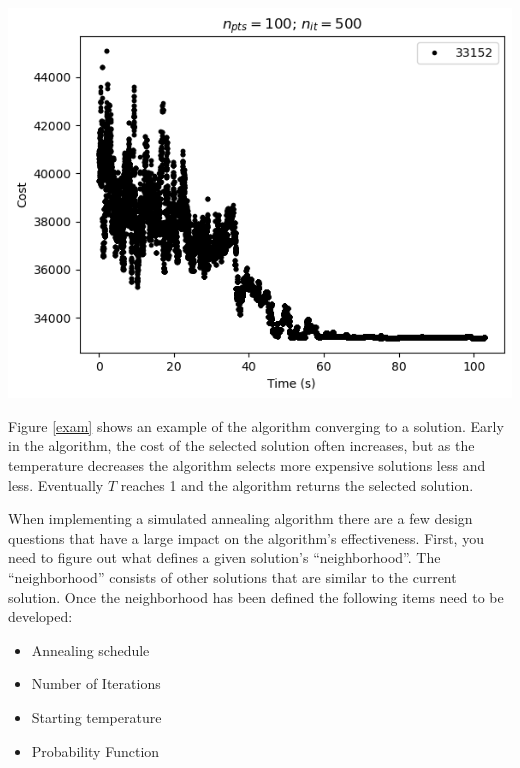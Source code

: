 \documentclass{article}
\begin{document}
\begin{multicols}{2}
        \begin{center}
            \begin{minipage}{0.9\columnwidth}
                \includegraphics[width=\columnwidth]{./sVal100/Annealing_100Pts_500it.png}
                \label{exam}
            \end{minipage}
        \end{center}
        
        Figure \ref{exam} shows an example of the algorithm converging to a solution. Early in the algorithm, the cost of the selected solution often increases, but as the temperature decreases the algorithm selects more expensive solutions less and less. Eventually $T$ reaches 1 and the algorithm returns the selected solution.

        When implementing a simulated annealing algorithm there are a few design questions that have a large impact on the algorithm's effectiveness. First, you need to figure out what defines a given solution's ``neighborhood''. The ``neighborhood'' consists of other solutions that are similar to the current solution. Once the neighborhood has been defined the following items need to be developed:

        \begin{itemize}
            \item {Annealing schedule}
            \item {Number of Iterations}
            \item {Starting temperature}
            \item {Probability Function}
        \end{itemize}


\end{multicols}
\end{document}
